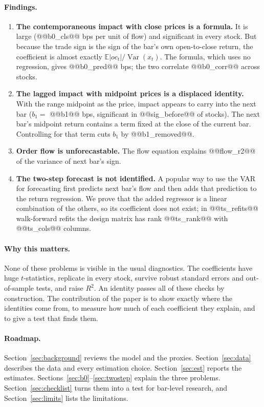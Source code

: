 \documentclass[11pt,a4paper]{article}
\newcommand{\E}{\mathbb{E}}
\begin{document}
\paragraph{Findings.}
\begin{enumerate}
\item \textbf{The contemporaneous impact with close prices is a formula.} It is large (@@b0_cls@@ bps
per unit of flow) and significant in every stock. But because the trade sign is the sign of the bar's
own open-to-close return, the coefficient is almost exactly
$\E|oc_t|/\operatorname{Var}(x_t)$. The formula, which uses no regression, gives @@b0_pred@@ bps; the
two correlate @@b0_corr@@ across stocks.
\item \textbf{The lagged impact with midpoint prices is a displaced identity.} With the range midpoint
as the price, impact appears to carry into the next bar ($b_1=$ @@b1@@ bps, significant in
@@sig_before@@ of stocks). The next bar's midpoint return contains a term fixed at the close of the
current bar. Controlling for that term cuts $b_1$ by @@b1_removed@@.
\item \textbf{Order flow is unforecastable.} The flow equation explains @@flow_r2@@ of the variance of
next bar's sign.
\item \textbf{The two-step forecast is not identified.} A popular way to use the VAR for forecasting
first predicts next bar's flow and then adds that prediction to the return regression. We prove that
the added regressor is a linear combination of the others, so its coefficient does not exist; in
@@ts_refits@@ walk-forward refits the design matrix has rank @@ts_rank@@ with @@ts_cols@@ columns.
\end{enumerate}

\paragraph{Why this matters.} None of these problems is visible in the usual diagnostics. The
coefficients have huge $t$-statistics, replicate in every stock, survive robust standard errors and
out-of-sample tests, and raise $R^2$. An identity passes all of these checks by construction. The
contribution of the paper is to show exactly where the identities come from, to measure how much of
each coefficient they explain, and to give a test that finds them.

\paragraph{Roadmap.} Section~\ref{sec:background} reviews the model and the proxies. Section~\ref{sec:data}
describes the data and every estimation choice. Section~\ref{sec:est} reports the estimates.
Sections~\ref{sec:b0}--\ref{sec:twostep} explain the three problems. Section~\ref{sec:checklist} turns
them into a test for bar-level research, and Section~\ref{sec:limits} lists the limitations.
\end{document}
